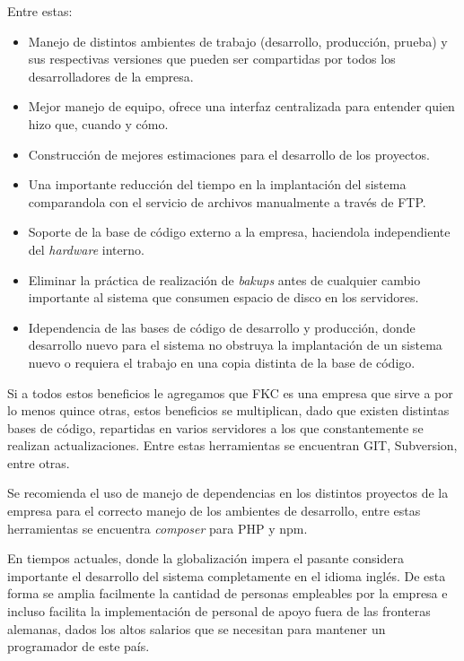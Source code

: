 Entre estas:

\begin{itemize}
	\item Manejo de distintos ambientes de trabajo (desarrollo, producción, prueba) y sus respectivas versiones que pueden ser compartidas por todos los desarrolladores de la empresa.
	
	\item Mejor manejo de equipo, ofrece una interfaz centralizada para entender quien hizo que, cuando y cómo.

	\item Construcción de mejores estimaciones para el desarrollo de los proyectos.

	\item Una importante reducción del tiempo en la implantación del sistema comparandola con el servicio de archivos manualmente a través de FTP.

		\item Soporte de la base de código externo a la empresa, haciendola independiente del \emph{hardware} interno.

		\item Eliminar la práctica de realización de \emph{bakups} antes de cualquier cambio importante al sistema que consumen espacio de disco en los servidores.

		\item Idependencia de las bases de código de desarrollo y producción, donde desarrollo nuevo para el sistema no obstruya la implantación de un sistema nuevo o requiera el trabajo en una copia distinta de la base de código.
\end{itemize}

Si a todos estos beneficios le agregamos que FKC es una empresa que sirve a por lo menos quince otras, estos beneficios se multiplican, dado que existen distintas bases de código, repartidas en varios servidores a los que constantemente se realizan actualizaciones. Entre estas herramientas se encuentran GIT, Subversion, entre otras.

Se recomienda el uso de manejo de dependencias en los distintos proyectos de la empresa para el correcto manejo de los ambientes de desarrollo, entre estas herramientas se encuentra \emph{composer} para PHP y npm. 

En tiempos actuales, donde la globalización impera el pasante considera importante el desarrollo del sistema completamente en el idioma inglés. De esta forma se amplia facilmente la cantidad de personas empleables por la empresa e incluso facilita la implementación de personal de apoyo fuera de las fronteras alemanas, dados los altos salarios que se necesitan para mantener un programador de este país.

